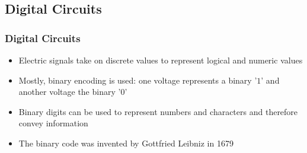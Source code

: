 \documentclass{beamer}
\begin{document}
\subsection{Digital Circuits}
\begin{frame}\frametitle{Digital Circuits} 
\begin{itemize}
\item Electric signals take on discrete values to represent logical and numeric values \pause
\item Mostly, binary encoding is used: one voltage represents a binary '$1$' and another voltage the binary '$0$' \pause
\item Binary digits can be used to represent numbers and characters and therefore convey information \pause
\item The binary code was invented by Gottfried Leibniz in 1679
\end{itemize}
\end{frame}
\end{document}
